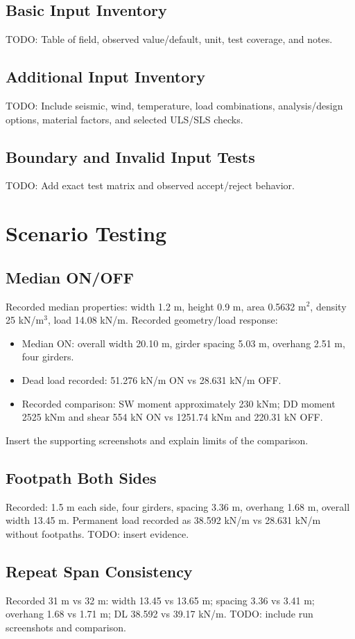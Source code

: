 \documentclass[11pt,a4paper]{report}
\begin{document}
\section{Basic Input Inventory}
TODO: Table of field, observed value/default, unit, test coverage, and notes.
\section{Additional Input Inventory}
TODO: Include seismic, wind, temperature, load combinations, analysis/design options, material factors, and selected ULS/SLS checks.
\section{Boundary and Invalid Input Tests}
TODO: Add exact test matrix and observed accept/reject behavior.

\chapter{Scenario Testing}
\section{Median ON/OFF}
Recorded median properties: width 1.2 m, height 0.9 m, area 0.5632 m$^2$, density 25 kN/m$^3$, load 14.08 kN/m.
Recorded geometry/load response:
\begin{itemize}
\item Median ON: overall width 20.10 m, girder spacing 5.03 m, overhang 2.51 m, four girders.
\item Dead load recorded: 51.276 kN/m ON vs 28.631 kN/m OFF.
\item Recorded comparison: SW moment approximately 230 kNm; DD moment 2525 kNm and shear 554 kN ON vs 1251.74 kNm and 220.31 kN OFF.
\end{itemize}
Insert the supporting screenshots and explain limits of the comparison.

\section{Footpath Both Sides}
Recorded: 1.5 m each side, four girders, spacing 3.36 m, overhang 1.68 m, overall width 13.45 m. Permanent load recorded as 38.592 kN/m vs 28.631 kN/m without footpaths. TODO: insert evidence.

\section{Repeat Span Consistency}
Recorded 31 m vs 32 m: width 13.45 vs 13.65 m; spacing 3.36 vs 3.41 m; overhang 1.68 vs 1.71 m; DL 38.592 vs 39.17 kN/m. TODO: include run screenshots and comparison.
\end{document}
